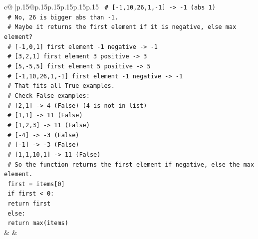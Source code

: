 \documentclass{article}
\begin{document}
{\begin{supertabular}{c@{$\;$}|p{.15\linewidth}@{}p{.15\linewidth}p{.15\linewidth}p{.15\linewidth}p{.15\linewidth}p{.15\linewidth}}
{{{\texttt{    \# {[}{-}1,10,26,1,{-}1{]} {-}> {-}1 (abs 1)} \\
\texttt{    \# No, 26 is bigger abs than {-}1.} \\
\texttt{    \# Maybe it returns the first element if it is negative, else max element?} \\
\texttt{    \# {[}{-}1,0,1{]} first element {-}1 negative {-}> {-}1} \\
\texttt{    \# {[}3,2,1{]} first element 3 positive {-}> 3} \\
\texttt{    \# {[}5,{-}5,5{]} first element 5 positive {-}> 5} \\
\texttt{    \# {[}{-}1,10,26,1,{-}1{]} first element {-}1 negative {-}> {-}1} \\
\texttt{    \# That fits all True examples.} \\
\texttt{    \# Check False examples:} \\
\texttt{    \# {[}2,1{]} {-}> 4 (False) (4 is not in list)} \\
\texttt{    \# {[}1,1{]} {-}> 11 (False)} \\
\texttt{    \# {[}1,2,3{]} {-}> 11 (False)} \\
\texttt{    \# {[}{-}4{]} {-}> {-}3 (False)} \\
\texttt{    \# {[}{-}1{]} {-}> {-}3 (False)} \\
\texttt{    \# {[}1,1,10,1{]} {-}> 11 (False)} \\
\texttt{    \# So the function returns the first element if negative, else the max element.} \\
\texttt{    first = items{[}0{]}} \\
\texttt{    if first < 0:} \\
\texttt{        return first} \\
\texttt{    else:} \\
\texttt{        return max(items)} \\
            }
        }
    }
    & & \\ \\


\end{supertabular}}
\end{document}

